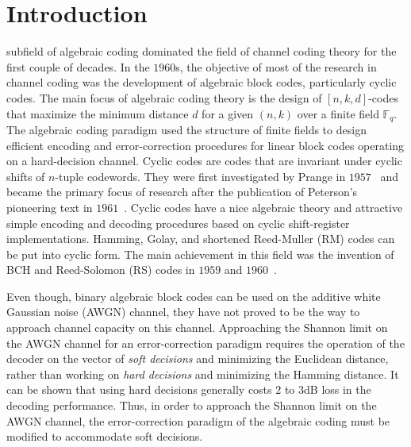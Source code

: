 \documentclass[journal,draftclsnofoot,onecolumn,12pt,twoside]{IEEEtran}
\begin{document}
\section{Introduction}
%
%
%
%



 subfield of algebraic coding dominated the field of channel coding theory for the first couple of decades. In the $1960$s, the objective of  most of the research  in channel coding was the development of  algebraic block codes, particularly cyclic codes. The main focus  of algebraic coding theory is the design of $[n,k,d]$-codes that maximize the minimum distance $d$ for a given $(n,k)$ over a finite field $\mathbb{F}_q$.  The algebraic coding paradigm used the structure of finite fields to design efficient encoding and error-correction procedures for linear block
codes operating on a hard-decision channel. Cyclic codes are codes that are invariant under cyclic shifts of $n$-tuple codewords. They were first investigated by  Prange in $1957$~\cite{00} and became the primary focus of research after the publication of Peterson's pioneering text in $1961$~\cite{01}. Cyclic codes have a nice algebraic theory and attractive simple encoding and decoding procedures based on cyclic shift-register implementations. Hamming, Golay, and shortened Reed-Muller (RM) codes can be put into cyclic form. The main achievement in this field was the invention of BCH and Reed-Solomon (RS) codes in $1959$ and $1960$~\cite{02,03,04}.

Even though, binary algebraic block codes can be used on the additive white Gaussian noise (AWGN) channel, they have not proved to be the way to approach  channel capacity on this channel.
Approaching the Shannon limit on the AWGN channel for an error-correction paradigm requires the operation of the decoder on the vector of \emph{soft decisions}
and minimizing the Euclidean distance, rather than working on \emph{hard decisions}
and minimizing the Hamming distance. It can be shown that using hard decisions generally costs $2$ to $3$dB loss in the decoding performance. Thus, in order to approach the Shannon limit on the AWGN channel, the error-correction paradigm of the algebraic coding must be modified to accommodate soft decisions.
\end{document}
